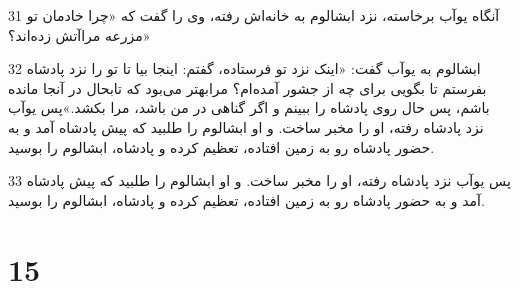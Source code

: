 \par 31 آنگاه یوآب برخاسته، نزد ابشالوم به خانه‌اش رفته، وی را گفت که «چرا خادمان تو مزرعه مراآتش زده‌اند؟»
\par 32 ابشالوم به یوآب گفت: «اینک نزد تو فرستاده، گفتم: اینجا بیا تا تو را نزد پادشاه بفرستم تا بگویی برای چه از جشور آمده‌ام؟ مرابهتر می‌بود که تابحال در آنجا مانده باشم، پس حال روی پادشاه را ببینم و اگر گناهی در من باشد، مرا بکشد.»پس یوآب نزد پادشاه رفته، او را مخبر ساخت. و او ابشالوم را طلبید که پیش پادشاه آمد و به حضور پادشاه رو به زمین افتاده، تعظیم کرده و پادشاه، ابشالوم را بوسید.
\par 33 پس یوآب نزد پادشاه رفته، او را مخبر ساخت. و او ابشالوم را طلبید که پیش پادشاه آمد و به حضور پادشاه رو به زمین افتاده، تعظیم کرده و پادشاه، ابشالوم را بوسید.
 
\chapter{15}

